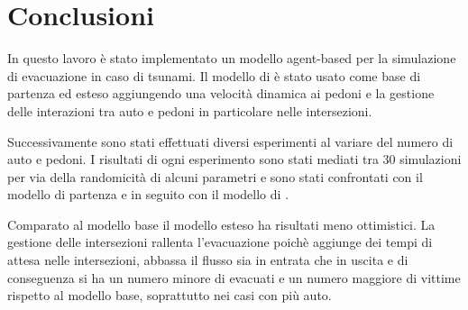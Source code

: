 \section{Conclusioni}
\label{sec:conclusione}



In questo lavoro è stato implementato un modello agent-based per la simulazione di evacuazione in caso di tsunami.
Il modello di \textcite{wang2016agent} è stato usato come base di partenza ed esteso aggiungendo una velocità 
dinamica ai pedoni e la gestione delle interazioni tra auto e pedoni in particolare nelle intersezioni.

Successivamente sono stati effettuati diversi esperimenti al variare del numero di auto e pedoni.
I risultati di ogni esperimento sono stati mediati tra 30 simulazioni per via della randomicità di alcuni parametri 
e sono stati confrontati con il modello di partenza e in seguito con il modello di \textcite{wang2021novel}.

Comparato al modello base il modello esteso ha risultati meno ottimistici.
La gestione delle intersezioni rallenta l'evacuazione poichè aggiunge dei tempi di attesa nelle intersezioni,
abbassa il flusso sia in entrata che in uscita e di conseguenza si ha un numero minore di evacuati e 
un numero maggiore di vittime rispetto al modello base, soprattutto nei casi con più auto.


